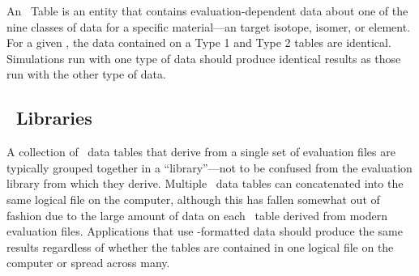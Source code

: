 An \ACE\ Table is an entity that contains evaluation-dependent data about one of the nine classes of data for a specific material---an target isotope, isomer, or element. For a given \ZAID, the data contained on a Type 1 and Type 2 tables are identical. Simulations run with one type of data should produce identical results as those run with the other type of data. 

\subsection{\ACE\ Libraries}
A collection of \ACE\ data tables that derive from a single set of evaluation files are typically grouped together in a ``library''---not to be confused from the evaluation library from which they derive. Multiple \ACE\ data tables can concatenated into the same logical file on the computer, although this has fallen somewhat out of fashion due to the large amount of data on each \ACE\ table derived from modern evaluation files. Applications that use \ACE-formatted data should produce the same results regardless of whether the tables are contained in one logical file on the computer or spread across many.
